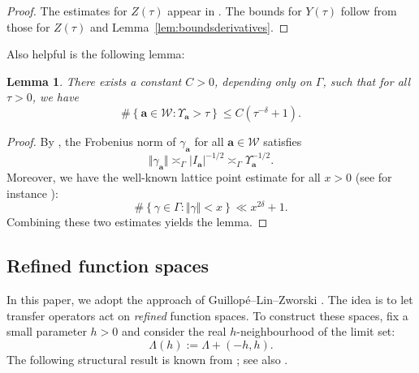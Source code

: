 \documentclass[12pt,letterpaper]{amsart}
\theoremstyle{plain}
\newtheorem{lemma}[prop]{Lemma}
\theoremstyle{definition}
\theoremstyle{remark}
\newcommand{\Aa}{\textbf{a}}
\begin{document}
\begin{proof}
The estimates for $Z(\tau)$ appear in \cite{Bourgain_Dyatlov, NaudMagee}. The bounds for $Y(\tau)$ follow from those for $Z(\tau)$ and Lemma~\ref{lem:boundsderivatives}.
\end{proof}

Also helpful is the following lemma:

\begin{lemma}\label{lem:cardsets}
There exists a constant \( C > 0 \), depending only on \( \Gamma \), such that for all \( \tau > 0 \), we have
\[
\#\left\{ \Aa \in \mathcal{W} : \Upsilon_{\Aa} > \tau \right\} \le C(\tau^{-\delta} + 1).
\]
\end{lemma}

\begin{proof}
By \cite[Lemma~10]{CalMag25}, the Frobenius norm of \( \gamma_{\Aa} \) for all \( \Aa \in \mathcal{W} \) satisfies
\[
\Vert \gamma_{\Aa} \Vert \asymp_\Gamma \vert I_\Aa\vert^{-1/2} \asymp_\Gamma \Upsilon_\Aa^{-1/2}.
\]
Moreover, we have the well-known lattice point estimate for all \( x > 0 \) (see for instance \cite[Theorem~14.22]{Borthwick_book}):
\[
\#\left\{ \gamma \in \Gamma : \Vert \gamma \Vert < x \right\} \ll x^{2\delta} + 1.
\]
Combining these two estimates yields the lemma.
\end{proof}





\subsection{Refined function spaces}\label{sec:refinedFuncti}
In this paper, we adopt the approach of Guillop\'{e}--Lin–Zworski \cite{GLZ}. The idea is to let transfer operators act on \textit{refined} function spaces. To construct these spaces, fix a small parameter $h > 0$ and consider the real $h$-neighbourhood of the limit set:
\begin{equation}\label{defi:realhneighbourhood}
\Lambda(h) := \Lambda + (-h, h).
\end{equation}
The following structural result is known from \cite{GLZ}; see also \cite[Lemma~15.14]{Borthwick_book}.
\end{document}
